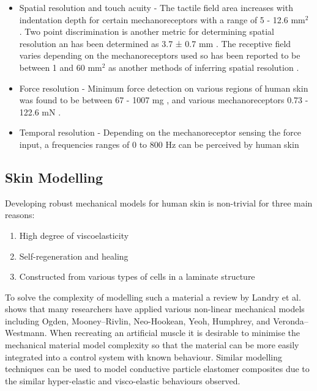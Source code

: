 \begin{itemize}
    \item Spatial resolution and touch acuity - The tactile field area increases with indentation depth for certain mechanoreceptors with a range of 5 - 12.6 mm$^2$ \cite{Deflorio2022}. Two point discrimination is another metric for determining spatial resolution an has been determined as 3.7 ± 0.7 mm \cite{Yokota2020}. The receptive field varies depending on the mechanoreceptors used so has been reported to be between 1 and 60 mm$^2$ as another methods of inferring spatial resolution \cite{Roudaut2012}.
    \item Force resolution - Minimum force detection on various regions of human skin was found to be between 67 - 1007 mg \cite{Ackerley2014}, and various mechanoreceptors 0.73 - 122.6 mN \cite{Strzalkowski2015}.
    \item Temporal resolution - Depending on the mechanoreceptor sensing the force input, a frequencies ranges of 0 to 800 Hz can be perceived by human skin \cite{Deflorio2022}
\end{itemize}


\subsection{Skin Modelling}
Developing robust mechanical models for human skin is non-trivial for three main reasons:
\begin{enumerate}
    \item High degree of viscoelasticity
    \item Self-regeneration and healing
    \item Constructed from various types of cells in a laminate structure 
\end{enumerate}
To solve the complexity of modelling such a material a review by Landry et al. \cite{Landry2021} shows that many researchers have applied various non-linear mechanical models including Ogden, Mooney–Rivlin, Neo-Hookean, Yeoh, Humphrey, and Veronda–Westmann. When recreating an artificial muscle it is desirable to minimise the mechanical material model complexity so that the material can be more easily integrated into a control system with known behaviour. Similar modelling techniques can be used to model conductive particle elastomer composites due to the similar hyper-elastic and visco-elastic behaviours observed.



